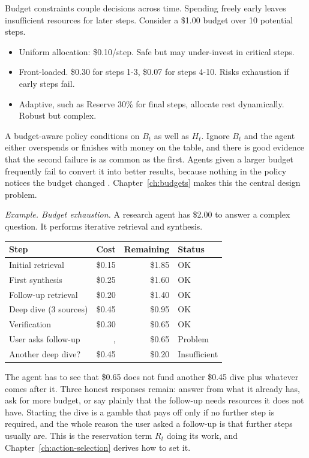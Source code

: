 Budget constraints couple decisions across time. Spending freely early leaves insufficient resources for later steps. Consider a \$1.00 budget over 10 potential steps.

\begin{itemize}
\item Uniform allocation: \$0.10/step. Safe but may under-invest in critical steps.
\item Front-loaded. \$0.30 for steps 1-3, \$0.07 for steps 4-10. Risks exhaustion if early steps fail.
\item Adaptive, such as Reserve 30\% for final steps, allocate rest dynamically. Robust but complex.
\end{itemize}

A budget-aware policy conditions on $B_t$ as well as $H_t$. Ignore $B_t$ and the agent either overspends or finishes with money on the table, and there is good evidence that the second failure is as common as the first. Agents given a larger budget frequently fail to convert it into better results, because nothing in the policy notices the budget changed \cite{budgettooluse2026}. Chapter~\ref{ch:budgets} makes this the central design problem.

\textit{Example. Budget exhaustion.} A research agent has \$2.00 to answer a complex question. It performs iterative retrieval and synthesis.

\begin{center}
\begin{tabular}{lrrl}
\toprule
Step & Cost & Remaining & Status \\
\midrule
Initial retrieval & \$0.15 & \$1.85 & OK \\
First synthesis & \$0.25 & \$1.60 & OK \\
Follow-up retrieval & \$0.20 & \$1.40 & OK \\
Deep dive (3 sources) & \$0.45 & \$0.95 & OK \\
Verification & \$0.30 & \$0.65 & OK \\
User asks follow-up &, & \$0.65 & Problem \\
Another deep dive? & \$0.45 & \$0.20 & Insufficient \\
\bottomrule
\end{tabular}
\end{center}

The agent has to see that \$0.65 does not fund another \$0.45 dive plus whatever comes after it. Three honest responses remain: answer from what it already has, ask for more budget, or say plainly that the follow-up needs resources it does not have. Starting the dive is a gamble that pays off only if no further step is required, and the whole reason the user asked a follow-up is that further steps usually are. This is the reservation term $R_t$ doing its work, and Chapter~\ref{ch:action-selection} derives how to set it.

